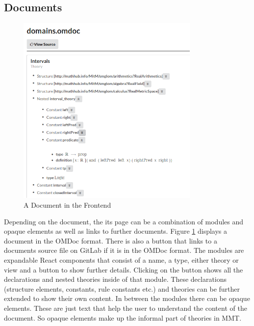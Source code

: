 \documentclass[11pt,a4paper]{article}
\begin{document}
\subsection{Documents}
\begin{figure}[H]
\centerline{\includegraphics[width=0.8\textwidth]{document.png}}
\caption{A Document in the Frontend}
\label{fig:doc}
\end{figure}
Depending on the document, the its page can be a combination of modules and opaque elements as well as links to further documents.
Figure \ref{fig:doc} displays a document in the OMDoc format.
There is also a button that links to a documents source file on GitLab if it is in the OMDoc format.
\newline \newline
The modules are expandable React components that consist of a name, a type, either theory or view and a button to show further details.
Clicking on the button shows all the declarations and nested theories inside of that module.
These declarations (structure elements, constants, rule constants etc.) and theories can be further extended to show their own content.
\newline \newline
In between the modules there can be opaque elements.
These are just text that help the user to understand the content of the document.
So opaque elements make up the informal part of theories in MMT.
\end{document}
